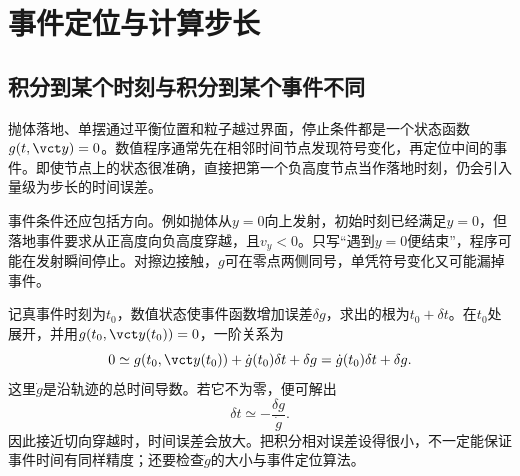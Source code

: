 \section{事件定位与计算步长}
\subsection{积分到某个时刻与积分到某个事件不同}
抛体落地、单摆通过平衡位置和粒子越过界面，停止条件都是一个状态函数$g(t,\vct y)=0$。数值程序通常先在相邻时间节点发现符号变化，再定位中间的事件。即使节点上的状态很准确，直接把第一个负高度节点当作落地时刻，仍会引入量级为步长的时间误差。

事件条件还应包括方向。例如抛体从$y=0$向上发射，初始时刻已经满足$y=0$，但落地事件要求从正高度向负高度穿越，且$v_y<0$。只写“遇到$y=0$便结束”，程序可能在发射瞬间停止。对擦边接触，$g$可在零点两侧同号，单凭符号变化又可能漏掉事件。

记真事件时刻为$t_0$，数值状态使事件函数增加误差$\delta g$，求出的根为$t_0+\delta t$。在$t_0$处展开，并用$g(t_0,\vct y(t_0))=0$，一阶关系为
\[
0\simeq g(t_0,\vct y(t_0))+\dot g(t_0)\delta t+\delta g
=\dot g(t_0)\delta t+\delta g.
\]
这里$\dot g$是沿轨迹的总时间导数。若它不为零，便可解出
\[
 \delta t\simeq-\frac{\delta g}{\dot g}.
\]
因此接近切向穿越时，时间误差会放大。把积分相对误差设得很小，不一定能保证事件时间有同样精度；还要检查$\dot g$的大小与事件定位算法。

